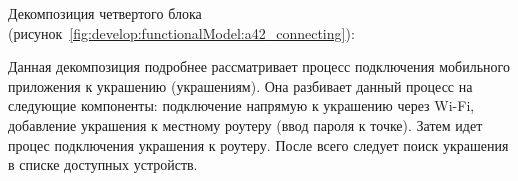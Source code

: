 Декомпозиция четвертого блока (рисунок~\ref{fig:develop:functionalModel:a42_connecting}):

Данная декомпозиция подробнее рассматривает процесс подключения мобильного приложения к украшению (украшениям). Она разбивает данный процесс на следующие компоненты: подключение напрямую к украшению через Wi-Fi, добавление украшения к местному роутеру (ввод пароля к точке). Затем идет процес подключения украшения к роутеру. После всего следует поиск украшения в списке доступных устройств.